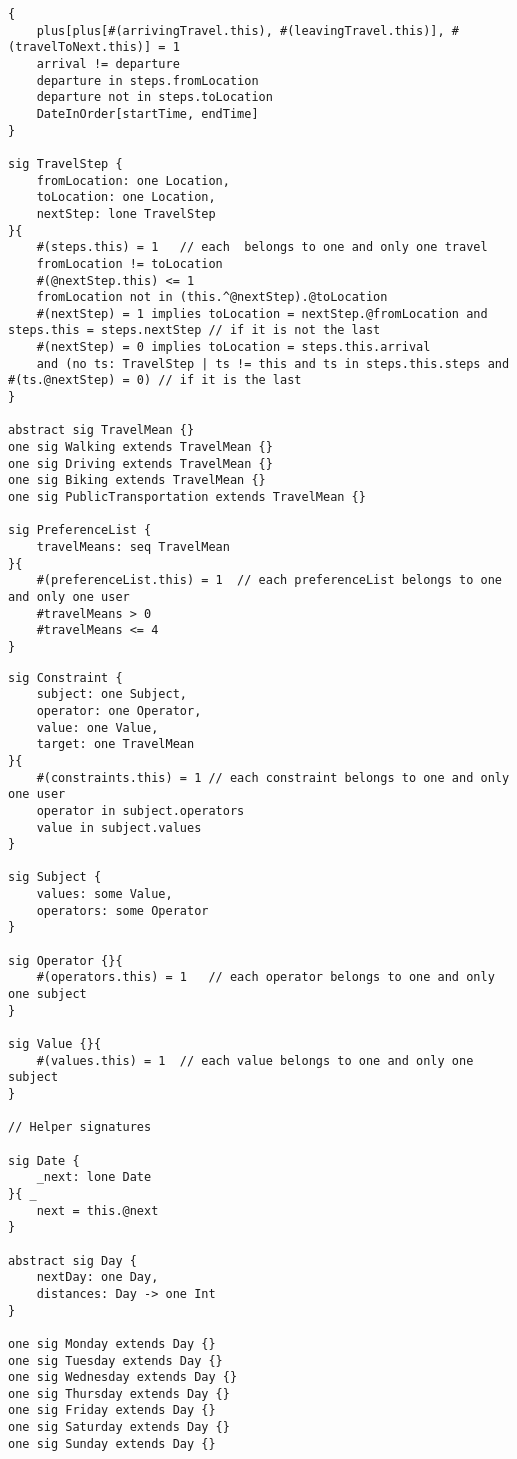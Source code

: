 \clearpage
\begin{lstlisting}[style=alloy]
{
	plus[plus[#(arrivingTravel.this), #(leavingTravel.this)], #(travelToNext.this)] = 1
	arrival != departure
	departure in steps.fromLocation
	departure not in steps.toLocation
	DateInOrder[startTime, endTime]
}

sig TravelStep {
	fromLocation: one Location,
	toLocation: one Location,
	nextStep: lone TravelStep
}{
	#(steps.this) = 1	// each  belongs to one and only one travel
	fromLocation != toLocation
	#(@nextStep.this) <= 1
	fromLocation not in (this.^@nextStep).@toLocation
	#(nextStep) = 1 implies toLocation = nextStep.@fromLocation and steps.this = steps.nextStep // if it is not the last
	#(nextStep) = 0 implies toLocation = steps.this.arrival 
	and (no ts: TravelStep | ts != this and ts in steps.this.steps and #(ts.@nextStep) = 0) // if it is the last
}

abstract sig TravelMean {}
one sig Walking extends TravelMean {}
one sig Driving extends TravelMean {}
one sig Biking extends TravelMean {}
one sig PublicTransportation extends TravelMean {}

sig PreferenceList {
	travelMeans: seq TravelMean
}{
	#(preferenceList.this) = 1	// each preferenceList belongs to one and only one user
	#travelMeans > 0
	#travelMeans <= 4
}
\end{lstlisting}
\clearpage
\begin{lstlisting}[style=alloy]
sig Constraint {
	subject: one Subject,
	operator: one Operator,
	value: one Value,
	target: one TravelMean
}{
	#(constraints.this) = 1	// each constraint belongs to one and only one user
	operator in subject.operators
	value in subject.values
}

sig Subject {
	values: some Value,
	operators: some Operator
}

sig Operator {}{
	#(operators.this) = 1	// each operator belongs to one and only one subject
}

sig Value {}{
	#(values.this) = 1	// each value belongs to one and only one subject
}

// Helper signatures

sig Date {
	_next: lone Date
}{ _
	next = this.@next 
}

abstract sig Day {
	nextDay: one Day,
	distances: Day -> one Int
}

one sig Monday extends Day {}
one sig Tuesday extends Day {}
one sig Wednesday extends Day {}
one sig Thursday extends Day {}
one sig Friday extends Day {}
one sig Saturday extends Day {}
one sig Sunday extends Day {}
\end{lstlisting}
\clearpage